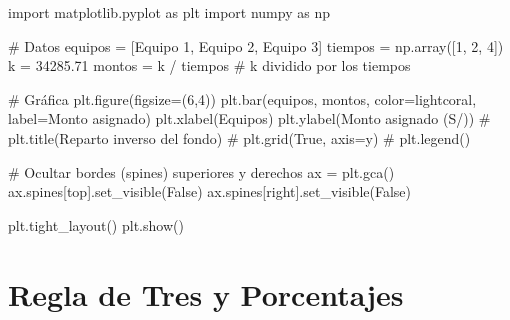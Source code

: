 \documentclass[
  stu,
  floatsintext,
  longtable,
  a4paper,
  nolmodern,
  notxfonts,
  notimes,
  12pt,
  colorlinks=true,linkcolor=blue,citecolor=blue,urlcolor=blue]{apa7}
\newenvironment{Shaded}{\begin{snugshade}}{\end{snugshade}}
\newcommand{\CommentTok}[1]{\textcolor[rgb]{0.37,0.37,0.37}{#1}}
\newcommand{\DecValTok}[1]{\textcolor[rgb]{0.68,0.00,0.00}{#1}}
\newcommand{\FloatTok}[1]{\textcolor[rgb]{0.68,0.00,0.00}{#1}}
\newcommand{\ImportTok}[1]{\textcolor[rgb]{0.00,0.46,0.62}{#1}}
\newcommand{\NormalTok}[1]{\textcolor[rgb]{0.00,0.23,0.31}{#1}}
\newcommand{\OperatorTok}[1]{\textcolor[rgb]{0.37,0.37,0.37}{#1}}
\newcommand{\StringTok}[1]{\textcolor[rgb]{0.13,0.47,0.30}{#1}}
\newcommand{\VariableTok}[1]{\textcolor[rgb]{0.07,0.07,0.07}{#1}}
\begin{document}
\begin{Shaded}
\begin{Highlighting}[]
\ImportTok{import}\NormalTok{ matplotlib.pyplot }\ImportTok{as}\NormalTok{ plt}
\ImportTok{import}\NormalTok{ numpy }\ImportTok{as}\NormalTok{ np}

\CommentTok{\# Datos}
\NormalTok{equipos }\OperatorTok{=}\NormalTok{ [}\StringTok{\textquotesingle{}Equipo 1\textquotesingle{}}\NormalTok{, }\StringTok{\textquotesingle{}Equipo 2\textquotesingle{}}\NormalTok{, }\StringTok{\textquotesingle{}Equipo 3\textquotesingle{}}\NormalTok{]}
\NormalTok{tiempos }\OperatorTok{=}\NormalTok{ np.array([}\DecValTok{1}\NormalTok{, }\DecValTok{2}\NormalTok{, }\DecValTok{4}\NormalTok{])}
\NormalTok{k }\OperatorTok{=} \FloatTok{34285.71}
\NormalTok{montos }\OperatorTok{=}\NormalTok{ k }\OperatorTok{/}\NormalTok{ tiempos  }\CommentTok{\# k dividido por los tiempos}

\CommentTok{\# Gráfica}
\NormalTok{plt.figure(figsize}\OperatorTok{=}\NormalTok{(}\DecValTok{6}\NormalTok{,}\DecValTok{4}\NormalTok{))}
\NormalTok{plt.bar(equipos, montos, color}\OperatorTok{=}\StringTok{\textquotesingle{}lightcoral\textquotesingle{}}\NormalTok{, label}\OperatorTok{=}\StringTok{\textquotesingle{}Monto asignado\textquotesingle{}}\NormalTok{)}
\NormalTok{plt.xlabel(}\StringTok{\textquotesingle{}Equipos\textquotesingle{}}\NormalTok{)}
\NormalTok{plt.ylabel(}\StringTok{\textquotesingle{}Monto asignado (S/)\textquotesingle{}}\NormalTok{)}
\CommentTok{\# plt.title(\textquotesingle{}Reparto inverso del fondo\textquotesingle{})}
\CommentTok{\# plt.grid(True, axis=\textquotesingle{}y\textquotesingle{})}
\CommentTok{\# plt.legend()}

\CommentTok{\# Ocultar bordes (spines) superiores y derechos}
\NormalTok{ax }\OperatorTok{=}\NormalTok{ plt.gca()}
\NormalTok{ax.spines[}\StringTok{\textquotesingle{}top\textquotesingle{}}\NormalTok{].set\_visible(}\VariableTok{False}\NormalTok{)}
\NormalTok{ax.spines[}\StringTok{\textquotesingle{}right\textquotesingle{}}\NormalTok{].set\_visible(}\VariableTok{False}\NormalTok{)}

\NormalTok{plt.tight\_layout()}
\NormalTok{plt.show()}
\end{Highlighting}
\end{Shaded}

\section{Regla de Tres y Porcentajes}\label{regla-de-tres-y-porcentajes}
\end{document}
